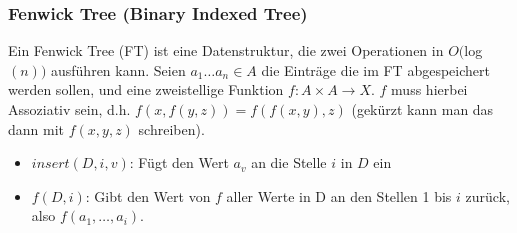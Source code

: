 

 \subsubsection{Fenwick Tree (Binary Indexed Tree)}
Ein Fenwick Tree (FT) ist eine Datenstruktur, die zwei Operationen in $O($log$(n))$ ausführen kann. Seien $a_1\dots a_n\in A$ die Einträge die im FT abgespeichert werden sollen, und eine zweistellige Funktion $f:A\times A \rightarrow X$. $f$ muss hierbei Assoziativ sein, d.h. $f(x,f(y,z))=f(f(x,y),z)$ (gekürzt kann man das dann mit $f(x,y,z)$ schreiben).
\begin{itemize}
    \item $insert(D,i,v)$: Fügt den Wert $a_v$ an die Stelle $i$ in $D$ ein
    \item $f(D,i)$: Gibt den Wert von $f$ aller Werte in D an den Stellen 1 bis $i$ zurück, also $f(a_1,\dots, a_i)$. 
\end{itemize}


